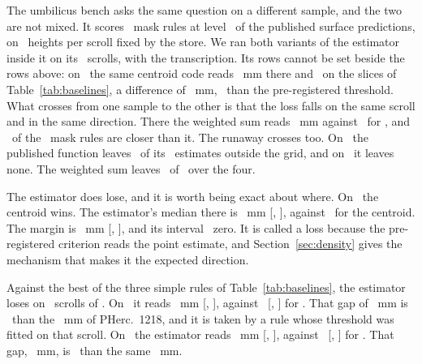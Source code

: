 The umbilicus bench asks the same question on a different sample, and the two are not mixed. It
scores \RevBenchMaskRules\ mask rules at level \RevBenchLevel\ of the published surface predictions,
on \RevBenchHeights\ heights per scroll fixed by the store. We ran both variants of the
estimator inside it on its \RevBenchScrolls\ scrolls, with the transcription. Its rows cannot be
set beside the rows above: on \RevBenchGapScroll\ the same centroid code reads
\RevBenchGapThere~mm there and \RevBenchGapHere\ on the slices of Table~\ref{tab:baselines}, a
difference of \RevBenchGap~mm, \RevBenchGapVsThreshold\ than the pre-registered threshold. What
crosses from one sample to the other is that the loss falls on the same scroll and in the same
direction. There the weighted sum reads \RevBenchLossFixed~mm against \RevBenchLossBest\ for
\RevBenchLossRule, and \RevBenchLossBeaten\ of the \RevBenchMaskRules\ mask rules are closer than
it. The runaway crosses too. On \RevBenchAwayScrolls\ the published function leaves
\RevBenchAwayCounts\ of its \RevBenchOutsideOf\ estimates outside the grid, and on \RevBenchStays\
it leaves none. The weighted sum leaves \RevBenchFixedOutside\ of \RevBenchFixedOf\ over the four.

The estimator does lose, and it is worth being exact about where. On \RevInfWorstPrimary\ the
centroid wins. The estimator's median there is \RevKZeroEightTwoSixMedian~mm
[\RevKZeroEightTwoSixLo, \RevKZeroEightTwoSixHi], against \RevKZeroEightTwoSixCentroid\ for the
centroid. The margin is \RevKZeroEightTwoSixMargin~mm [\RevKZeroEightTwoSixMarginLo,
\RevKZeroEightTwoSixMarginHi], and its interval \RevKZeroEightTwoSixZero\ zero. It is called a loss
because the pre-registered criterion reads the point estimate, and Section~\ref{sec:density} gives
the mechanism that makes it the expected direction.

Against the best of the three simple rules of Table~\ref{tab:baselines}, the estimator loses on
\RevBlLosses\ scrolls of \RevBlScrolls. On \RevBlLossOneScroll\ it reads \RevBlLossOneFixed~mm
[\RevBlLossOneLo, \RevBlLossOneHi], against \RevBlLossOneBest\ [\RevBlLossOneBestLo,
\RevBlLossOneBestHi] for \RevBlLossOneRule. That gap of \RevBlLossOneGap~mm is
\RevBlLossOneVsSpread\ than the \UmbReferenceSpread~mm of PHerc.\ 1218, and it is taken by a rule
whose threshold was fitted on that scroll. On \RevBlLossTwoScroll\ the estimator reads
\RevBlLossTwoFixed~mm [\RevBlLossTwoLo, \RevBlLossTwoHi], against \RevBlLossTwoBest\
[\RevBlLossTwoBestLo, \RevBlLossTwoBestHi] for \RevBlLossTwoRule. That gap, \RevBlLossTwoGap~mm,
is \RevBlLossTwoVsSpread\ than the same \UmbReferenceSpread~mm.

